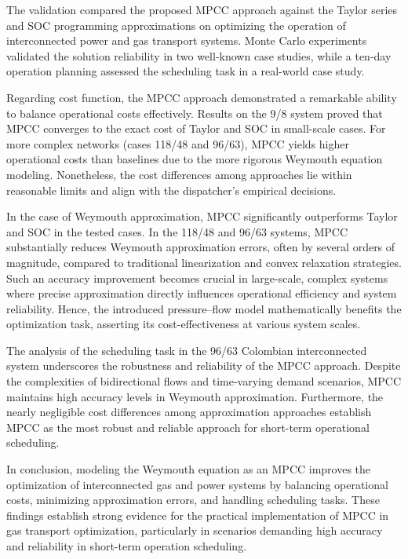 The validation compared the proposed MPCC approach against the Taylor series and SOC programming approximations on optimizing the operation of interconnected power and gas transport systems. Monte Carlo experiments validated the solution reliability in two well-known case studies, while a ten-day operation planning assessed the scheduling task in a real-world case study.

Regarding cost function, the MPCC approach demonstrated a remarkable ability to balance operational costs effectively. Results on the  9/8 system proved that MPCC converges to the exact cost of Taylor and SOC in small-scale cases. For more complex networks (cases 118/48 and 96/63), MPCC yields higher operational costs than baselines due to the more rigorous Weymouth equation modeling. Nonetheless, the cost differences among approaches lie within reasonable limits and align with the dispatcher's empirical decisions.

In the case of Weymouth approximation, MPCC significantly outperforms Taylor and SOC in the tested cases. In the 118/48 and 96/63 systems, MPCC substantially reduces Weymouth approximation errors, often by several orders of magnitude, compared to traditional linearization and convex relaxation strategies. Such an accuracy improvement becomes crucial in large-scale, complex systems where precise approximation directly influences operational efficiency and system reliability. Hence, the introduced pressure--flow model mathematically benefits the optimization task, asserting its cost-effectiveness at various system scales.

The analysis of the scheduling task in the 96/63 Colombian interconnected system underscores the robustness and reliability of the MPCC approach. Despite the complexities of bidirectional flows and time-varying demand scenarios, MPCC maintains high accuracy levels in Weymouth approximation. Furthermore, the nearly negligible cost differences among approximation approaches establish MPCC as the most robust and reliable approach for short-term operational scheduling.

In conclusion, modeling the Weymouth equation as an MPCC improves the optimization of interconnected gas and power systems by balancing operational costs, minimizing approximation errors, and handling scheduling tasks. These findings establish strong evidence for the practical implementation of MPCC in gas transport optimization, particularly in scenarios demanding high accuracy and reliability in short-term operation scheduling.

